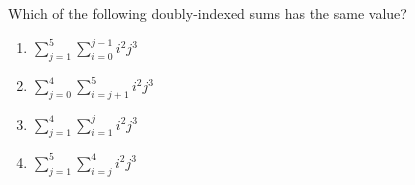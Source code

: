 \documentclass{article}
\begin{document}
\begin{enumerate}
\begin{center}
                \end{center}
                
                 Which of the following doubly-indexed sums has the same value?
                 
                 \begin{enumerate}
                     \item $ \sum_{j=1}^{5}\sum_{i=0}^{j-1} i^2j^3$
                     \item $ \sum_{j=0}^{4}\sum_{i=j+1}^{5} i^2j^3$
                     \item $ \sum_{j=1}^{4}\sum_{i=1}^{j} i^2j^3$
                     \item $ \sum_{j=1}^{5}\sum_{i=j}^{4} i^2j^3$
                 \end{enumerate}
                    

\end{enumerate}
\end{document}
